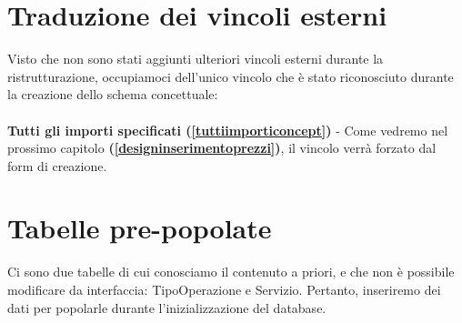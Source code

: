 \section{Traduzione dei vincoli esterni}
Visto che non sono stati aggiunti ulteriori vincoli esterni durante la ristrutturazione, occupiamoci dell'unico vincolo che \`e stato riconosciuto durante
la creazione dello schema concettuale:
\\\\
\textbf{Tutti gli importi specificati (\ref{tuttiimporticoncept})} - Come vedremo nel prossimo capitolo \textbf{(\ref{designinserimentoprezzi})}, il vincolo verr\`a forzato dal form di creazione.

\section {Tabelle pre-popolate}
Ci sono due tabelle di cui conosciamo il contenuto a priori, e che non \`e possibile modificare da interfaccia: TipoOperazione e Servizio. Pertanto, inseriremo dei dati per popolarle
durante l'inizializzazione del database.

